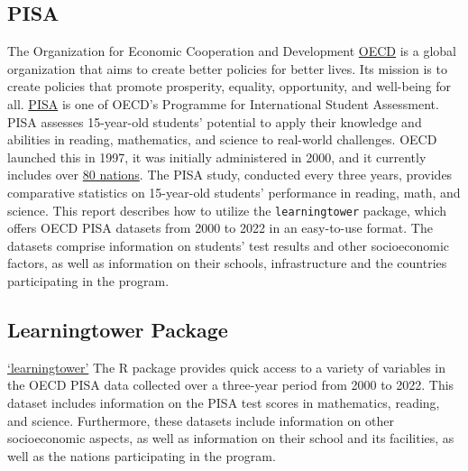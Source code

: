 \documentclass[
  11pt,
  a4paper,
]{article}
\begin{document}
\subsection{PISA}\label{pisa}

The Organization for Economic Cooperation and Development
\href{https://www.oecd.org/about/}{OECD} is a global organization that
aims to create better policies for better lives. Its mission is to
create policies that promote prosperity, equality, opportunity, and
well-being for all. \autocite{oecd}
\href{https://www.oecd.org/pisa/}{PISA} is one of OECD's Programme for
International Student Assessment. PISA assesses 15-year-old students'
potential to apply their knowledge and abilities in reading,
mathematics, and science to real-world challenges. OECD launched this in
1997, it was initially administered in 2000, and it currently includes
over
\href{https://www.oecd.org/pisa/aboutpisa/pisa-participants.html}{80
nations}. \autocite{pisa} The PISA study, conducted every three years,
provides comparative statistics on 15-year-old students' performance in
reading, math, and science. This report describes how to utilize the
\texttt{learningtower} package, which offers OECD PISA datasets from
2000 to 2022 in an easy-to-use format. The datasets comprise information
on students' test results and other socioeconomic factors, as well as
information on their schools, infrastructure and the countries
participating in the program.

\subsection{Learningtower Package}\label{learningtower-package}

\href{https://cran.r-project.org/web/packages/learningtower/index.html}{`learningtower'}
The R package \autocite{learningtower} provides quick access to a
variety of variables in the OECD PISA data collected over a three-year
period from 2000 to 2022. This dataset includes information on the PISA
test scores in mathematics, reading, and science. Furthermore, these
datasets include information on other socioeconomic aspects, as well as
information on their school and its facilities, as well as the nations
participating in the program.
\end{document}
